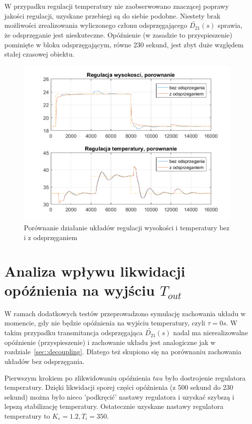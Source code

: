 \documentclass{article}
\begin{document}
W przypadku regulacji temperatury nie zaobserwowano znaczącej poprawy jakości regulacji, uzyskane przebiegi są do siebie podobne. Niestety brak możliwości zrealizowania wyliczonego członu odsprzęgającego $\widetilde{D_{21}}(s)$ sprawia, że odsprzęganie jest nieskuteczne. Opóźnienie (w zasadzie to przyspieszenie) pominięte w bloku odsprzęgającym, równe 230 sekund, jest zbyt duże względem stałej czasowej obiektu.
\begin{figure}[htb]
	\centering
	\includegraphics[width=\textwidth]{pid_hT_comparison.PNG}
	\caption{Porównanie działanie układów regulacji wysokości i temperatury bez i z odsprzęganiem}
	\label{fig::pid_hT_comparison}
\end{figure}


\section{Analiza wpływu likwidacji opóźnienia na wyjściu $T_{out}$}
W ramach dodatkowych testów przeprowadzono symulację zachowania układu w momencie, gdy nie będzie opóźnienia na wyjściu temperatury, czyli $\tau = 0s$. W takim przypadku transmitancja odsprzęgająca $\widetilde{D_{21}}(s)$ nadal ma nierealizowalne opóźnienie (przyspieszenie) i zachowanie układu jest analogiczne jak w rozdziale~\ref{sec::decoupling}. Dlatego też skupiono się na porównaniu zachowania układów bez odsprzęgania.

Pierwszym krokiem po zlikwidowaniu opóźnienia $tau$ było dostrojenie regulatora temperatury. Dzięki likwidacji sporej części opóźnienia (z 500 sekund do 230 sekund) można było nieco 'podkręcić' nastawy regulatora i uzyskać szybszą i lepszą stabilizację temperatury. Ostatecznie uzyskane nastawy regulatora temperatury to $K_e = 1.2, T_i = 350$.
\end{document}
